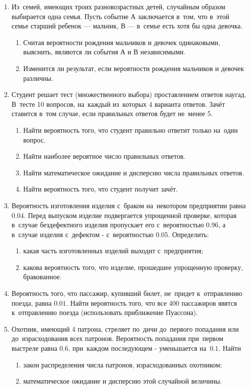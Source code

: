 \begin{enumerate}
\item  Из~семей, имеющих троих разновозрастных детей, случайным образом выбирается
одна семья. Пусть событие А заключается в~том, что в~этой семье старший ребенок —
мальчик, В — в~семье есть хотя бы одна девочка.
\begin{enumerate}
\item Считая вероятности рождения мальчиков и девочек одинаковыми, выяснить,
являются ли события А и В независимыми.
\item Изменится ли результат, если вероятности рождения мальчиков и девочек различны.
\end{enumerate}

\item Студент решает тест (множественного выбора) проставлением ответов наугад.
В~тесте 10 вопросов, на~каждый из~которых 4 варианта ответов. Зачёт ставится в~том
случае, если правильных ответов будет не~менее 5.
\begin{enumerate}
\item Найти вероятность того, что студент правильно ответит только на~один вопрос.
\item Найти наиболее вероятное число правильных ответов.
\item Найти математическое ожидание и дисперсию числа правильных ответов.
\item Найти вероятность того, что студент получит зачёт.
\end{enumerate}

\item Вероятность изготовления изделия с~браком на~некотором предприятии равна
$0.04$. Перед выпуском изделие подвергается упрощенной проверке, которая в~случае
бездефектного изделия пропускает его с~вероятностью $0.96$, а в~случае изделия
с~дефектом - с~вероятностью $0.05$. Определить:
\begin{enumerate}
\item какая часть изготовленных изделий выходит с~предприятия;
\item какова вероятность того, что изделие, прошедшее упрощенную проверку, бракованное.
\end{enumerate}

\item  Вероятность того, что пассажир, купивший билет, не~придет к~отправлению
поезда, равна $0.01$. Найти вероятность того, что все 400 пассажиров явятся
к~отправлению поезда (использовать приближение Пуассона).

\item Охотник, имеющий 4 патрона, стреляет по~дичи до~первого попадания или
до~израсходования всех патронов. Вероятность попадания при~первом выстреле равна
$0.6$, при~каждом последующем - уменьшается на~$0.1$. Найти
\begin{enumerate}
\item закон распределения числа патронов, израсходованных охотником;
\item математическое ожидание и дисперсию этой случайной величины.
\end{enumerate}


\end{enumerate}
